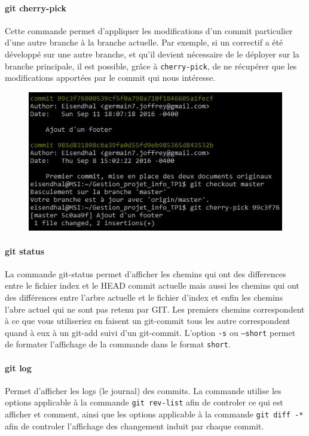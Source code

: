 \documentclass[11pt,canadien]{article}
\begin{document}
\paragraph{git cherry-pick}Cette commande permet d'appliquer les modifications d'un commit particulier d'une autre branche à la branche actuelle. Par exemple, si un correctif a été développé sur une autre branche, et qu'il devient nécessaire
de le déployer sur la branche principale, il est possible, grâce à \texttt{cherry-pick}, de ne récupérer que les modifications apportées par le commit qui nous intéresse.
\begin{figure}[H]
	\centering
	\includegraphics[width=\textwidth]{images/git_cherry-pick.jpg}
\end{figure}

\paragraph{git status}La commande git-status permet d'afficher les chemins qui ont des differences entre le fichier index et le HEAD commit actuelle mais aussi les chemins qui ont des différences entre l'arbre actuelle et le fichier d'index et enfin les chemins l'abre actuel qui ne sont pas retenu par GIT. Les premiers chemins correspondent à ce que vous utiliseriez en faisent un git-commit tous les autre correspondent quand à eux à un git-add suivi d'un git-commit. L'option \texttt{-s} ou \texttt{--short} permet de formater l'affichage de la commande dans le format \texttt{short}.

\paragraph{git log}Permet d'afficher les logs (le journal) des commits. La commande utilise les options applicable à la commande \texttt{git rev-list} afin de controler ce qui est afficher et comment, ainsi que les options applicable à la commande \texttt{git diff -*} afin de controler l'affichage des changement induit par  chaque commit.
\end{document}
